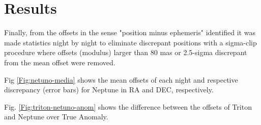 \documentclass[12pt,a4paper]{report}
\newcommand{\PE}{Perkin-Elmer }
\newcommand{\BC}{Boller \& Chivens }
\begin{document}
\section*{Results}

Finally, from the offsets in the sense "position minus ephemeris" identified it was made statistics night by night to eliminate discrepant positions with a sigma-clip procedure where offsets (modulus) larger than 80 mas or 2.5-sigma discrepant from the mean offset were removed.%

Fig \ref{Fig:netuno-media} shows the mean offsets of each night and respective discrepancy (error bars) for Neptune in RA and DEC, respectively.




Fig. \ref{Fig:triton-netuno-anom} shows the difference between the offsets of Triton and Neptune over True Anomaly. %


\end{document}
